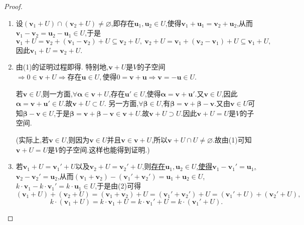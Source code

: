 \documentclass[../../main.tex]{subfiles}%
\begin{document}
\begin{proof}
\begin{enumerate}[(1)]
\item 设\((\boldsymbol{v}_1 + U)\cap(\boldsymbol{v}_2 + U)\neq\varnothing\),即存在\(\boldsymbol{u}_1,\boldsymbol{u}_2\in U\),使得\(\boldsymbol{v}_1+\boldsymbol{u}_1=\boldsymbol{v}_2+\boldsymbol{u}_2\),从而\(\boldsymbol{v}_1-\boldsymbol{v}_2=\boldsymbol{u}_2-\boldsymbol{u}_1\in U\),于是
\[
\boldsymbol{v}_1 + U=\boldsymbol{v}_2+(\boldsymbol{v}_1 - \boldsymbol{v}_2)+U\subseteq\boldsymbol{v}_2 + U,\ \boldsymbol{v}_2 + U=\boldsymbol{v}_1+(\boldsymbol{v}_2 - \boldsymbol{v}_1)+U\subseteq\boldsymbol{v}_1 + U,
\]
因此\(\boldsymbol{v}_1 + U=\boldsymbol{v}_2 + U\).
\item 由(1)的证明过程即得. 特别地,\(\boldsymbol{v}+U\)是\(V\)的子空间\(\Rightarrow0\in \boldsymbol{v}+U\Rightarrow \text{存在}\boldsymbol{u}\in U,\text{使得}0=\boldsymbol{v}+\boldsymbol{u}\Rightarrow \boldsymbol{v}=-\boldsymbol{u}\in U \).

若$\boldsymbol{v}\in U$,则一方面,$\forall \boldsymbol{\alpha }\in \boldsymbol{v}+U$,存在$\boldsymbol{u}'\in U$,使得$\boldsymbol{\alpha }=\boldsymbol{v}+\boldsymbol{u}'$.又$\boldsymbol{v}\in U$,因此$\boldsymbol{\alpha }=\boldsymbol{v}+\boldsymbol{u}'\in U$.故$\boldsymbol{v}+U\subset U$.
另一方面,$\forall \boldsymbol{\beta }\in U$,有$\boldsymbol{\beta }=\boldsymbol{v}+\boldsymbol{\beta }-\boldsymbol{v}$.又由$\boldsymbol{v}\in U$可知$\boldsymbol{\beta }-\boldsymbol{v}\in U$,于是$\boldsymbol{\beta }=\boldsymbol{v}+\boldsymbol{\beta }-\boldsymbol{v}\in \boldsymbol{v}+U$.故$\boldsymbol{v}+U\supset U$.因此$\boldsymbol{v}+U = U$是\(V\)的子空间.

(实际上,若$\boldsymbol{v}\in U$,则因为$\boldsymbol{v}\in U\text{并且}\boldsymbol{v}\in \boldsymbol{v}+U$,所以$\boldsymbol{v}+U\cap U\ne \varnothing$.故由(1)可知$\boldsymbol{v}+U=U$是\(V\)的子空间.这样也能得到证明.)

\item 若\(\boldsymbol{v}_1 + U=\boldsymbol{v}_1'+U\)以及\(\boldsymbol{v}_2 + U=\boldsymbol{v}_2'+U\),则\hyperlink{remark1陪集}{存在\(\boldsymbol{u}_1,\boldsymbol{u}_2\in U\),使得\(\boldsymbol{v}_1-\boldsymbol{v}_1'=\boldsymbol{u}_1\),\(\boldsymbol{v}_2-\boldsymbol{v}_2'=\boldsymbol{u}_2\)},从而\((\boldsymbol{v}_1+\boldsymbol{v}_2)-(\boldsymbol{v}_1'+\boldsymbol{v}_2')=\boldsymbol{u}_1+\boldsymbol{u}_2\in U\),\(k\cdot\boldsymbol{v}_1 - k\cdot\boldsymbol{v}_1'=k\cdot\boldsymbol{u}_1\in U\),于是由(2)可得
\[
(\boldsymbol{v}_1 + U)+(\boldsymbol{v}_2 + U)=(\boldsymbol{v}_1+\boldsymbol{v}_2)+U=(\boldsymbol{v}_1'+\boldsymbol{v}_2')+U=(\boldsymbol{v}_1'+U)+(\boldsymbol{v}_2'+U),
\]
\[
k\cdot(\boldsymbol{v}_1 + U)=k\cdot\boldsymbol{v}_1+U=k\cdot\boldsymbol{v}_1'+U=k\cdot(\boldsymbol{v}_1'+U).
\]
\end{enumerate}

\end{proof}
\end{document}
